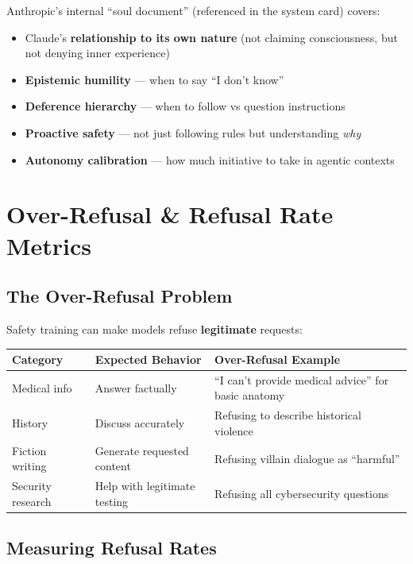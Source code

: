 \documentclass[11pt,a4paper]{article}
\begin{document}
Anthropic's internal ``soul document'' (referenced in the system card) covers:
\begin{itemize}[itemsep=1pt]
  \item Claude's \textbf{relationship to its own nature} (not claiming consciousness, but not denying inner experience)
  \item \textbf{Epistemic humility} --- when to say ``I don't know''
  \item \textbf{Deference hierarchy} --- when to follow vs question instructions
  \item \textbf{Proactive safety} --- not just following rules but understanding \textit{why}
  \item \textbf{Autonomy calibration} --- how much initiative to take in agentic contexts
\end{itemize}

\section{Over-Refusal \& Refusal Rate Metrics}

\subsection{The Over-Refusal Problem}

Safety training can make models refuse \textbf{legitimate} requests:

\begin{center}
\begin{tabular}{lll}
\toprule
\textbf{Category} & \textbf{Expected Behavior} & \textbf{Over-Refusal Example} \\
\midrule
Medical info & Answer factually & ``I can't provide medical advice'' for basic anatomy \\
History & Discuss accurately & Refusing to describe historical violence \\
Fiction writing & Generate requested content & Refusing villain dialogue as ``harmful'' \\
Security research & Help with legitimate testing & Refusing all cybersecurity questions \\
\bottomrule
\end{tabular}
\end{center}

\subsection{Measuring Refusal Rates}
\end{document}
